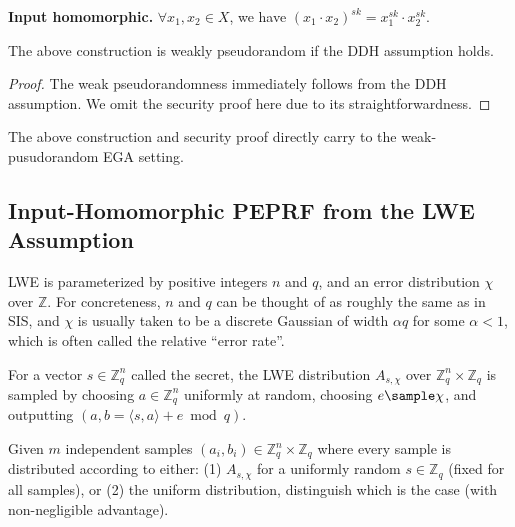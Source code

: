 \documentclass[a4paper,10pt]{article}
\begin{document}
\begin{trivlist}
\item \textbf{Input homomorphic.} $\forall x_1, x_2 \in X$, we have $(x_1 \cdot x_2)^{sk} = x_1^{sk} \cdot x_2^{sk}$. 
\end{trivlist}

\begin{theorem}
The above construction is weakly pseudorandom if the DDH assumption holds. 
\end{theorem}

\begin{proof}
The weak pseudorandomness immediately follows from the DDH assumption. 
We omit the security proof here due to its straightforwardness. 
\end{proof}

The above construction and security proof directly carry to the weak-pusudorandom EGA setting.

\subsection{Input-Homomorphic PEPRF from the LWE Assumption}\label{subsec:IHPEPRF-from-LWE}
LWE is parameterized by positive integers $n$ and $q$, and an error distribution $\chi$ over $\mathbb{Z}$. 
For concreteness, $n$ and $q$ can be thought of as roughly the same as in SIS, 
and $\chi$ is usually taken to be a discrete Gaussian of width $\alpha q$ for some $\alpha < 1$, 
which is often called the relative ``error rate''. 


\begin{definition} 
For a vector $s \in \mathbb{Z}_q^n$ called the secret, the LWE distribution $A_{s,\chi}$ 
over $\mathbb{Z}_q^n \times \mathbb{Z}_q$ is sampled by choosing $a \in \mathbb{Z}_q^n$ uniformly at random, 
choosing $e \sample \chi$, and outputting $(a, b = \langle s, a\rangle + e \bmod q)$.
\end{definition}

\begin{definition}
Given $m$ independent samples $(a_i, b_i) \in \mathbb{Z}_q^n \times \mathbb{Z}_q$ where every sample is distributed 
according to either: (1) $A_{s,\chi}$ for a uniformly random $s \in \mathbb{Z}_q$ (fixed for all samples), 
or (2) the uniform distribution, distinguish which is the case (with non-negligible advantage).
\end{definition}
\end{document}
